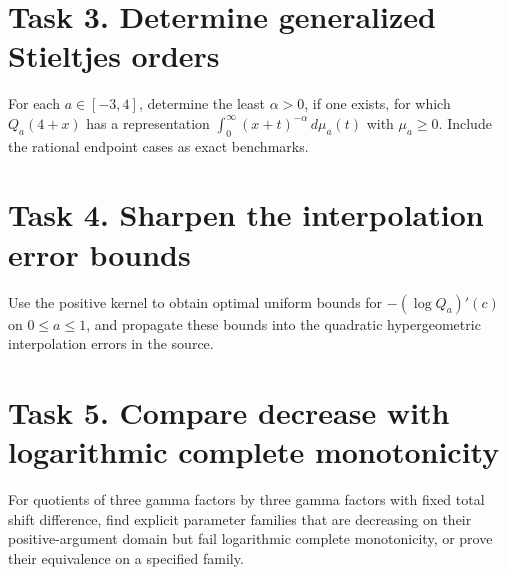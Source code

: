\documentclass[11pt]{article}
\begin{document}
\section*{Task 3. Determine generalized Stieltjes orders}
For each $a\in[-3,4]$, determine the least $\alpha>0$, if one exists,
for which $Q_a(4+x)$ has a representation
$\int_0^\infty(x+t)^{-\alpha}\,d\mu_a(t)$ with $\mu_a\ge0$.
Include the rational endpoint cases as exact benchmarks.

\section*{Task 4. Sharpen the interpolation error bounds}
Use the positive kernel to obtain optimal uniform bounds for
$-(\log Q_a)'(c)$ on $0\le a\le1$, and propagate these bounds into
the quadratic hypergeometric interpolation errors in the source.

\section*{Task 5. Compare decrease with logarithmic complete monotonicity}
For quotients of three gamma factors by three gamma factors with fixed
total shift difference, find explicit parameter families that are
decreasing on their positive-argument domain but fail logarithmic
complete monotonicity, or prove their equivalence on a specified family.
\end{document}
